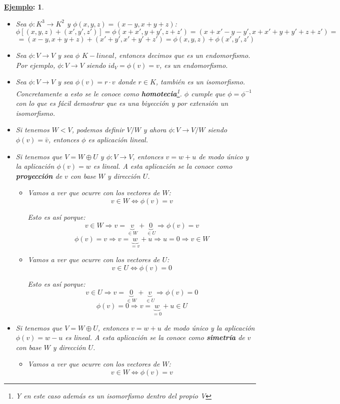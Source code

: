 \documentclass[10pt,a4paper,openright]{book}
\theoremstyle{break}
\newtheorem*{ej}{\underline{Ejemplo}:}
\begin{document}
\begin{ej}
\begin{itemize}
\item Sea $\phi: K^3\longrightarrow K^2$ y $\phi(x,y,z)=(x-y, x+y+z)$:
$$\phi\left[(x,y,z)+(x',y',z')\right]=\phi(x+x',y+y',z+z')=(x+x'-y-y', x+x'+y+y'+z+z')=$$
$$=(x-y, x+y+z)+(x'+y',x'+y'+z')=\phi(x,y,z)+\phi(x',y',z')$$

\item Sea $\phi: V\longrightarrow V$ y sea $\phi$ $K-lineal$, entonces decimos que es un endomorfismo. Por ejemplo, $\phi: V\longrightarrow V$ siendo $id_V=\phi(v)=v$, es un endomorfismo.

\item Sea $\phi: V\longrightarrow V$ y sea $\phi(v)=r\cdot v$ donde $r\in K$, también es un isomorfismo. Concretamente a esto se le conoce como \textbf{homotecia}\footnote{Y en este caso además es un isomorfismo dentro del propio V}. $\phi$ cumple que $\phi=\phi^{-1}$ con lo que es fácil demostrar que es una biyección y por extensión un isomorfismo. 

\item Si tenemos $W<V$, podemos definir $V/W$ y ahora $\phi: V\longrightarrow V/W$ siendo $\phi(v)=\bar{v}$, entonces $\phi$ es aplicación lineal.

\item Si tenemos que $V=W\oplus U$ y $\phi: V\longrightarrow V$, entonces $v=w+u$ de modo único y la aplicación $\phi(v)=w$ es lineal. A esta aplicación se la conoce como \textbf{proyección} de $v$ con base $W$ y dirección $U$.
\begin{itemize}
\item Vamos a ver que ocurre con los vectores de $W$:
$$v\in W\Leftrightarrow \phi(v)=v$$

Esto es así porque:
$$v\in W\Rightarrow v=\underbrace{v}_{\in W}+\underbrace{0}_{\in U}\Rightarrow \phi(v)=v$$
$$\phi(v)=v\Rightarrow v=\underbrace{w}_{=v}+u\Rightarrow u=0\Rightarrow v\in W$$

\item Vamos a ver que ocurre con los vectores de $U$:
$$v\in U\Leftrightarrow \phi(v)=0$$

Esto es así porque:
$$v\in U\Rightarrow v=\underbrace{0}_{\in W}+\underbrace{v}_{\in U}\Rightarrow \phi(v)=0$$
$$\phi(v)=0\Rightarrow v=\underbrace{w}_{=0}+u\in U$$
\end{itemize}

\item Si tenemos que $V=W\oplus U$, entonces $v=w+u$ de modo único y la aplicación $\phi(v)=w-u$ es lineal. A esta aplicación se la conoce como \textbf{simetría} de $v$ con base $W$ y dirección $U$.
\begin{itemize}
\item Vamos a ver que ocurre con los vectores de $W$:
$$v\in W\Leftrightarrow \phi(v)=v$$


\end{itemize}
\end{itemize}
\end{ej}
\end{document}
